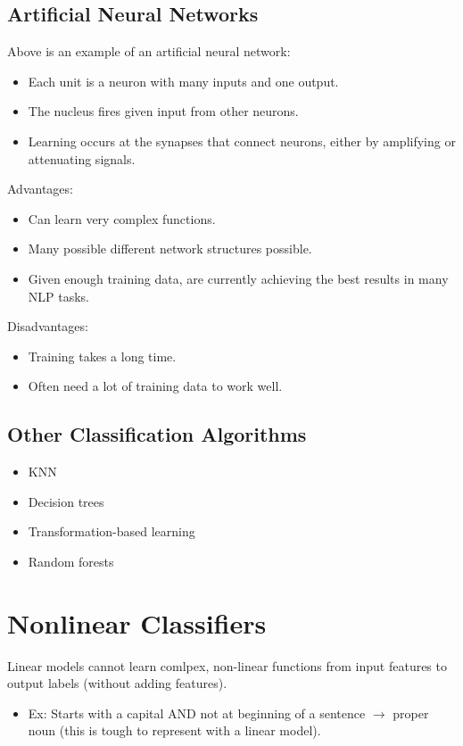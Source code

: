 \documentclass{article}
\begin{document}
\subsection{Artificial Neural Networks}
Above is an example of an artificial neural network:
\begin{itemize}
    \item Each unit is a neuron with many inputs and one output.
    \item The nucleus fires given input from other neurons.
    \item Learning occurs at the synapses that connect neurons, either by amplifying or attenuating signals.
\end{itemize}
Advantages:
\begin{itemize}
    \item Can learn very complex functions.
    \item Many possible different network structures possible.
    \item Given enough training data, are currently achieving the best results in many NLP tasks.
\end{itemize}
Disadvantages:
\begin{itemize}
    \item Training takes a long time.
    \item Often need a lot of training data to work well.
\end{itemize}
\subsection{Other Classification Algorithms}
\begin{itemize}
    \item KNN
    \item Decision trees
    \item Transformation-based learning
    \item Random forests
\end{itemize}
\section{Nonlinear Classifiers}
Linear models cannot learn comlpex, non-linear functions from input features to output labels (without adding features).
\begin{itemize}
    \item Ex: Starts with a capital AND not at beginning of a sentence $\rightarrow$ proper noun (this is tough to represent with a linear model).
\end{itemize}
\end{document}
